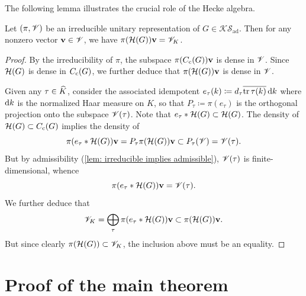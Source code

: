 \documentclass[a4paper, 10pt]{article}
\newcommand{\aks}{\mathcal{KS}_{\mathrm{ad}}}
\begin{document}
The following lemma illustrates the crucial role of the Hecke algebra.

\begin{lemma}\label{lem: H(G) gives all K-finite}
    Let $(\pi,\mathscr{V})$ be an irreducible unitary representation of $G\in\aks$. Then for any nonzero vector $\mathbf{v}\in\mathscr{V}$, we have $\pi(\mathcal{H}(G))\mathbf{v} = \mathscr{V}_K$.
\end{lemma}
\begin{proof}
    By the irreducibility of $\pi$, the subspace $\pi(C_{\mathrm{c}}(G))\mathbf{v}$ is dense in $\mathscr{V}$. Since $\mathcal{H}(G)$ is dense in $C_{\mathrm{c}}(G)$, we further deduce that $\pi(\mathcal{H}(G))\mathbf{v}$ is dense in $\mathscr{V}$.
    
    Given any $\tau\in\widehat{K}$, consider the associated idempotent 
    $ e_\tau(k) \coloneq d_\tau \overline{\operatorname{tr}\tau(k)}\mathop{}\!\mathrm{d} k$ where $\mathop{}\!\mathrm{d} k$ is the normalized Haar measure on $K$, so that $P_\tau\coloneq \pi(e_\tau)$ is the orthogonal projection onto the subspace $\mathscr{V}(\tau)$. Note that $e_\tau * \mathcal{H}(G)\subset \mathcal{H}(G)$.
    The density of $\mathcal{H}(G)\subset C_{\mathrm{c}}(G)$ implies the density of
    $$ \pi(e_\tau * \mathcal{H}(G))\mathbf{v} = P_{\tau}\pi(\mathcal{H}(G))\mathbf{v} \subset P_\tau(\mathscr{V}) = \mathscr{V}(\tau).$$
    But by admissibility (\autoref{lem: irreducible implies admissible}), $\mathscr{V}(\tau)$ is finite-dimensional, whence
    \begin{equation*}
        \pi(e_\tau * \mathcal{H}(G))\mathbf{v} = \mathscr{V}(\tau).
    \end{equation*}
    We further deduce that
    \begin{equation*}
        \mathscr{V}_K = \bigoplus_{\tau} \pi(e_\tau * \mathcal{H}(G))\mathbf{v} \subset \pi(\mathcal{H}(G))\mathbf{v}.
    \end{equation*}
    But since clearly $\pi(\mathcal{H}(G))\subset\mathscr{V}_K$, the inclusion above must be an equality.
\end{proof}


\section{Proof of the main theorem}\label{sec: proof}
\end{document}
